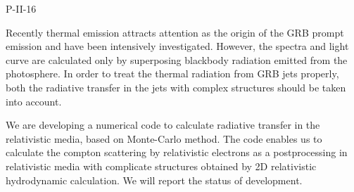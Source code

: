 P-II-16


\bigskip



\bigskip

\noindent Recently thermal emission attracts attention as the origin of the GRB prompt emission and have been intensively investigated. However, the spectra and light curve are calculated only by superposing blackbody radiation emitted from the photosphere. In order to treat the thermal radiation from GRB jets properly, both the radiative transfer in the jets with complex structures should be taken into account.

We are developing a numerical code to calculate radiative transfer in the relativistic media, based on Monte-Carlo method. The code enables us to calculate the compton scattering by relativistic electrons as a postprocessing in relativistic media with complicate structures obtained by 2D relativistic hydrodynamic calculation. We will report the status of development.
